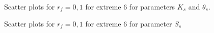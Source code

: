 \documentclass[review]{elsarticle}
\begin{document}
\begin{figure}[htb!]
\label{ext6rf0-Kt}
\caption{Scatter plots for $r_f=0,1$ for extreme 6 for parameters $K_s$ and $\theta_s$. }
\end{figure}

\begin{figure}[htb!]
\label{ext6rf0-Ss}
\caption{Scatter plots for $r_f=0,1$ for extreme 6 for parameter $S_s$}
\end{figure}
\end{document}
